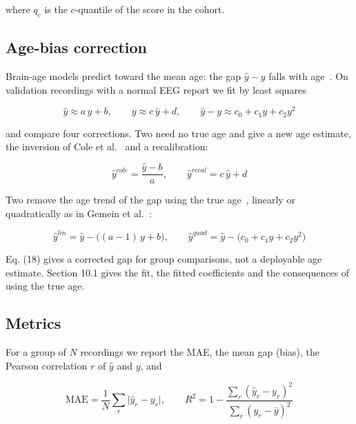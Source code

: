 \documentclass[11pt,a4paper]{article}
\begin{document}
where $q_c$ is the $c$-quantile of the score in the cohort.

\subsection{Age-bias correction}

Brain-age models predict toward the mean age: the gap $\hat y - y$ falls with age~\citep{smith2019delta}. On validation recordings with a normal EEG report we fit by least squares

\begin{equation}
\hat y \approx a\,y + b, \qquad y \approx c\,\hat y + d, \qquad \hat y - y \approx c_0 + c_1 y + c_2 y^2 \tag{16}
\end{equation}

and compare four corrections. Two need no true age and give a new age estimate, the inversion of Cole et al.~\citep{cole2018mortality} and a recalibration:

\begin{equation}
\hat y^{cole} = \frac{\hat y - b}{a}, \qquad \hat y^{recal} = c\,\hat y + d \tag{17}
\end{equation}

Two remove the age trend of the gap using the true age~\citep{beheshti2019bias,delange2020commentary}, linearly or quadratically as in Gemein et al.~\citep{gemein2024revisited}:

\begin{equation}
\hat y^{lin} = \hat y - \big( (a-1)\,y + b \big), \qquad \hat y^{quad} = \hat y - \big( c_0 + c_1 y + c_2 y^2 \big) \tag{18}
\end{equation}

Eq. (18) gives a corrected gap for group comparisons, not a deployable age estimate. Section 10.1 gives the fit, the fitted coefficients and the consequences of using the true age.

\subsection{Metrics}

For a group of $N$ recordings we report the MAE, the mean gap (bias), the Pearson correlation $r$ of $\hat y$ and $y$, and

\begin{equation}
\mathrm{MAE} = \frac{1}{N} \sum_r \lvert \hat y_r - y_r \rvert, \qquad R^2 = 1 - \frac{\sum_r (\hat y_r - y_r)^2}{\sum_r (y_r - \bar y)^2} \tag{19}
\end{equation}
\end{document}
